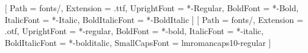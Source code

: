 \setmainfont{EBGaramond}[
  Path = fonts/,
  Extension = .ttf,
  UprightFont = *-Regular,
  BoldFont = *-Bold,
  ItalicFont = *-Italic,
  BoldItalicFont = *-BoldItalic
]
\newfontfamily{}[
  Path = fonts/,
  Extension = .otf,
  UprightFont = *-regular,
  BoldFont = *-bold,
  ItalicFont = *-italic,
  BoldItalicFont = *-bolditalic,
  SmallCapsFont = lmromancaps10-regular
]
